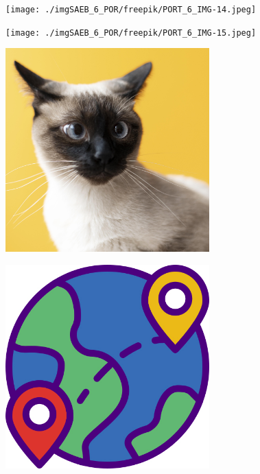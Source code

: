 \begin{figure}
\texttt{[image: ./imgSAEB\_6\_POR/freepik/PORT\_6\_IMG-14.jpeg]}
\end{figure}

\begin{figure}
\texttt{[image: ./imgSAEB\_6\_POR/freepik/PORT\_6\_IMG-15.jpeg]}
\end{figure}

\begin{figure}
\includegraphics[width=0.7\textwidth]{./imgSAEB_6_POR/freepik/PORT_6_IMG-16.jpeg}
\end{figure}

\begin{figure}
\includegraphics[width=0.7\textwidth]{./imgSAEB_6_POR/freepik/PORT_6_IMG-17.jpeg}
\end{figure}

